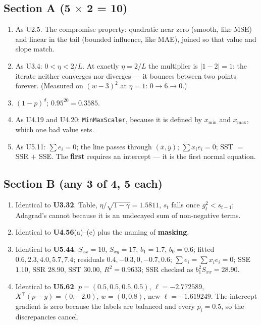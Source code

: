 \documentclass[11pt,a4paper]{article}
\begin{document}
\subsection*{Section A (5 $\times$ 2 = 10)}
\begin{enumerate}[label=\textbf{\arabic*.}, leftmargin=*]
\item As U2.5. The compromise property: quadratic near zero (smooth, like MSE)
  and linear in the tail (bounded influence, like MAE), joined so that value and
  slope match.
\item As U3.4: $0 < \eta < 2/L$. At exactly $\eta = 2/L$ the multiplier is
  $|1-2| = 1$: the iterate neither converges nor diverges --- it bounces between
  two points forever. (Measured on $(w-3)^2$ at $\eta = 1$: $0 \to 6 \to 0$.)
\item $(1-p)^d$; $0.95^{20} = \mathbf{0.3585}$.
\item As U4.19 and U4.20: \texttt{MinMaxScaler}, because it is defined by
  $x_{\min}$ and $x_{\max}$, which one bad value sets.
\item As U5.11: $\sum e_i = 0$; the line passes through $(\bar x,\bar y)$;
  $\sum x_ie_i = 0$; SST $=$ SSR $+$ SSE. The \textbf{first} requires an
  intercept --- it is the first normal equation.
\end{enumerate}

\subsection*{Section B (any 3 of 4, 5 each)}
\begin{enumerate}[label=\textbf{\arabic*.}, leftmargin=*, start=6]
\item Identical to \textbf{U3.32}. Table, $\eta/\sqrt{1-\gamma} = 1.5811$,
  $s_t$ falls once $g_t^2 < s_{t-1}$; Adagrad's cannot because it is an
  undecayed sum of non-negative terms.
\item Identical to \textbf{U4.56}(a)--(c) plus the naming of \textbf{masking}.
\item Identical to \textbf{U5.44}. $S_{xx} = 10$, $S_{xy} = 17$, $b_1 = 1.7$,
  $b_0 = 0.6$; fitted $0.6, 2.3, 4.0, 5.7, 7.4$; residuals
  $0.4, -0.3, 0, -0.7, 0.6$; $\sum e_i = \sum x_ie_i = 0$;
  SSE $1.10$, SSR $28.90$, SST $30.00$, $R^2 = 0.9633$;
  SSR checked as $b_1^2S_{xx} = 28.90$.
\item Identical to \textbf{U5.62}. $p = (0.5,0.5,0.5,0.5)$,
  $\ell = -2.772589$, $X^\top(p-y) = (0, -2.0)$, $w = (0, 0.8)$,
  new $\ell = -1.619249$. The intercept gradient is zero because the labels
  are balanced and every $p_i = 0.5$, so the discrepancies cancel.
\end{enumerate}
\end{document}
